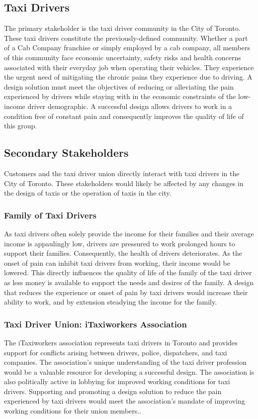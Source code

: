 \documentclass[11pt]{article}
\begin{document}
\subsection{Taxi Drivers}
The primary stakeholder is the taxi driver community in the City of
Toronto. These taxi drivers constitute the previously-defined community. 
Whether a part of a Cab Company franchise or simply employed by a cab company, 
all members of this community face economic uncertainty, safety risks and health 
concerns associated with their everyday job when operating their vehicles. They 
experience the urgent need of mitigating the chronic pains they experience due 
to driving. A design solution must meet the objectives of reducing or 
alleviating the pain experienced by drivers while staying with in the 
economic constraints of the low-income driver demographic. A successful
design allows drivers to work in a condition free of constant pain and 
consequently improves the quality of life of this group. 
 
\subsection{Secondary Stakeholders} 
Customers and the taxi driver union directly interact with taxi 
drivers in the City of Toronto. These stakeholders would likely be 
affected by any changes in the design of taxis or the operation of taxis 
in the city. 

\subsubsection{Family of Taxi Drivers}
As taxi drivers often solely provide the 
income for their families and their average income is appaulingly low, drivers are pressured to work prolonged hours to support their families. Consequently, the health of drivers deteriorates. 
As the onset of pain can inhibit taxi drivers from working, their income would be lowered. This directly influences 
the quality of life of the family of the taxi driver as less money is available to support the needs and desires of the family. A design that
reduces the experience or onset of pain by taxi drivers would increase their ability 
to work, and by extension steadying the income for the family. 


\subsubsection{Taxi Driver Union: iTaxiworkers Association}
The iTaxiworkers association represents taxi drivers in Toronto and 
provides support for conflicts arising between drivers, police, dispatchers, and 
taxi companies. The association’s unique understanding of the taxi driver 
profession would be a valuable resource for developing a successful design.
The association is also politically active in lobbying for improved working 
conditions for taxi drivers. Supporting and promoting a design solution to 
reduce the pain experienced by taxi drivers would meet the association’s mandate 
of improving working conditions for their union members.\cite{itaxi}. 
\end{document}
